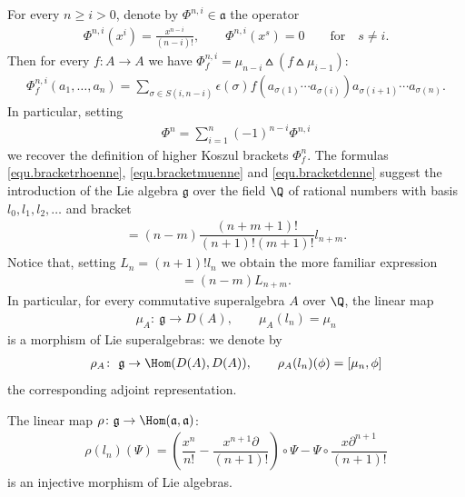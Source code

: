 For every $n\ge i>0$, denote by $\Phi^{n,i}\in \mathfrak{a}$ the operator
\begin{gather*} \Phi^{n,i}(x^{i})=\frac{x^{n-i}}{(n-i)!} ,\qquad \Phi^{n,i}(x^s)=0\qquad \text{for}\quad s\not=i.\end{gather*}
Then for every $f\colon A\to A$ we have $\Phi^{n,i}_f=\mu_{n-i}\wedgebar (f\wedgebar\mu_{i-1})$:
\begin{gather*}\Phi^{n,i}_f(a_1,\ldots,a_{n})=\sum_{\sigma\in S(i,n-i)}\epsilon(\sigma)
f(a_{\sigma(1)}\cdots a_{\sigma(i)})a_{\sigma(i+1)}\cdots a_{\sigma(n)}.\end{gather*}
In particular, setting
\begin{gather*} \Phi^n=\sum_{i=1}^n(-1)^{n-i}\Phi^{n,i}\end{gather*}
we recover the def\/inition of higher Koszul brackets $\Phi^n_f$.
The formulas \eqref{equ.bracketrhoenne}, \eqref{equ.bracketmuenne} and \eqref{equ.bracketdenne} suggest the introduction of the Lie algebra
$\mathfrak{g}$ over the f\/ield $\Q$ of rational numbers with basis $l_0,l_1,l_2,\ldots$ and bracket
\begin{gather*}[l_n,l_m]=(n-m)\dfrac{(n+m+1)!}{(n+1)!(m+1)!}l_{n+m}.\end{gather*}
Notice that, setting $L_n=(n+1)! l_n$ we obtain the more familiar expression
\begin{gather*}[L_n,L_m]=(n-m)L_{n+m}.\end{gather*}
In particular, for every commutative superalgebra $A$ over $\Q$, the linear map
\begin{gather*} \mu_A\colon \ \mathfrak{g}\to D(A),\qquad \mu_A(l_n)=\mu_n\end{gather*}
is a morphism of Lie superalgebras: we denote by
\begin{gather*} \rho_A\colon \ \mathfrak{g}\to \Hom(D(A),D(A)),\qquad \rho_A(l_n)(\phi)=[\mu_n,\phi]\end{gather*}
the corresponding adjoint representation.

\begin{Lemma} The linear map $\rho\colon \mathfrak{g}\to \Hom(\mathfrak{a},\mathfrak{a})$:
\begin{gather*} \rho(l_n)(\Psi)=\left(\dfrac{x^n}{n!}-\dfrac{x^{n+1}\partial}{(n+1)!}\right)\circ \Psi-
\Psi\circ \dfrac{x\partial^{n+1}}{(n+1)!}\end{gather*}
is an injective morphism of Lie algebras.
\end{Lemma}

